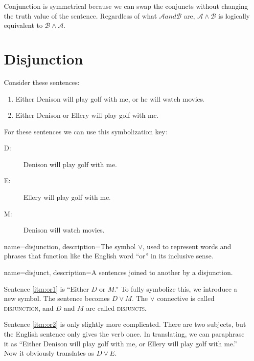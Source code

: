 Conjunction is symmetrical because we can swap the conjuncts without changing the truth value of the sentence. Regardless of what $\mathcal{A} and \mathcal{B}$ are, $\mathcal{A}\land\mathcal{B}$ is logically equivalent to $\mathcal{B} \land \mathcal{A}$.



\section{Disjunction}
Consider these sentences:
\begin{enumerate}
\item Either Denison will play golf with me, or he will watch movies. \label{itm:or1}
\item Either Denison or Ellery will play golf with me. \label{itm:or2}
\end{enumerate}

For these sentences we can use this symbolization key:

\begin{description}
\item[D:] Denison will play golf with me.
\item[E:] Ellery will play golf with me.
\item[M:] Denison will watch movies.
\end{description}

{
name=disjunction,
description={The symbol $\lor$, used to represent words and phrases that function like the English word ``or'' in its inclusive sense.}
}

{
name=disjunct,
description={A sentences joined to another by a disjunction.}
}

Sentence \ref{itm:or1} is ``Either $D$ or $M$.'' To fully symbolize this, we introduce a new symbol. The sentence becomes $D \lor M$. The $\lor$ connective is called \textsc{\gls{disjunction}}, \label{def:disjunction} and $D$ and $M$ are called \textsc{\glspl{disjunct}}. \label{def:disjunct}

Sentence \ref{itm:or2} is only slightly more complicated. There are two subjects, but the English sentence only gives the verb once. In translating, we can paraphrase it as ``Either Denison will play golf with me, or Ellery will play golf with me.'' Now it obviously translates as $D \lor E$.

